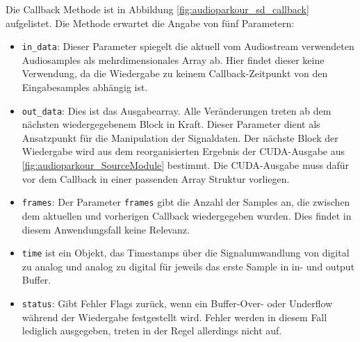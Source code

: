 Die Callback Methode ist in Abbildung \ref{fig:audioparkour_sd_callback} aufgelistet. Die Methode erwartet die Angabe von fünf Parametern:

\begin{itemize}
	\item \texttt{in\_data}: Dieser Parameter spiegelt die aktuell vom Audiostream verwendeten Audiosamples als mehrdimensionales Array ab. Hier findet dieser keine Verwendung, da die Wiedergabe zu keinem Callback-Zeitpunkt von den Eingabesamples abhängig ist.
	\item \texttt{out\_data}: Dies ist das Ausgabearray. Alle Veränderungen treten ab dem nächsten wiedergegebenem Block in Kraft. Dieser Parameter dient als Ansatzpunkt für die Manipulation der Signaldaten. Der nächste Block der Wiedergabe wird aus dem reorganisierten Ergebnis der CUDA-Ausgabe aus \ref{fig:audioparkour_SourceModule} bestimmt. Die CUDA-Ausgabe muss dafür vor dem Callback in einer passenden Array Struktur vorliegen. 
	\item \texttt{frames}: Der Parameter \texttt{frames} gibt die Anzahl der Samples an, die zwischen dem aktuellen und vorherigen Callback wiedergegeben wurden. Dies findet in diesem Anwendungsfall keine Relevanz.
	\item \texttt{time} ist ein Objekt, das Timestamps über die Signalumwandlung von digital zu analog und analog zu digital für jeweils das erste Sample in in- und output Buffer.
	\item \texttt{status}: Gibt Fehler Flags zurück, wenn ein Buffer-Over- oder Underflow während der Wiedergabe festgestellt wird. Fehler werden in diesem Fall lediglich ausgegeben, treten in der Regel allerdings nicht auf.
\end{itemize}

